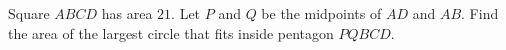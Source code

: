Square $ABCD$ has area $21$. Let $P$ and $Q$ be the midpoints of $AD$ and $AB$. Find the area of the largest circle that fits inside pentagon $PQBCD$.

